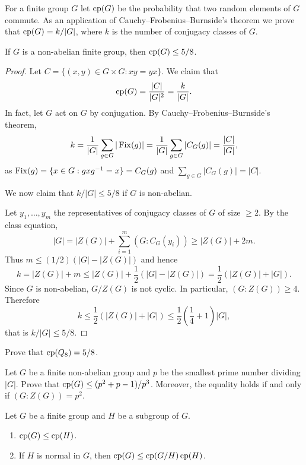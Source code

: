For a finite group $G$ let $\operatorname{cp}(G)$ be the probability 
that two random elements of $G$ commute. 
As an application of Cauchy--Frobenius--Burnside's theorem we
prove that 
$\operatorname{cp}(G)=k/|G|$, where $k$ is the number of conjugacy classes
of $G$.

\begin{theorem}
    If $G$ is a non-abelian finite group, then $\operatorname{cp}(G)\leq5/8$.
\end{theorem}

\begin{proof}
    Let $C=\{(x,y)\in G\times G:xy=yx\}$. We claim that  
    \[
    \operatorname{cp}(G)=\frac{|C|}{|G|^2}=\frac{k}{|G|}.
    \]
    In fact, let $G$ act on $G$ by conjugation. 
    By Cauchy--Frobenius--Burnside's theorem, 
    \[
    k=\frac{1}{|G|}\sum_{g\in G}|\operatorname{Fix}(g)|=\frac{1}{|G|}\sum_{g\in G}|C_G(g)|=\frac{|C|}{|G|},
    \]
    as $\operatorname{Fix}(g)=\{x\in G:gxg^{-1}=x\}=C_G(g)$ and $\sum_{g\in G}|C_G(g)|=|C|$. 

    We now claim that $k/|G|\leq 5/8$ if $G$ is non-abelian.
    
    Let $y_1,\dots,y_m$ the representatives of conjugacy classes of $G$ 
    of size $\geq2$. By the class equation, 
    \[
    |G|=|Z(G)|+\sum_{i=1}^m(G:C_G(y_i))\geq |Z(G)|+2m.
    \]
    Thus $m\leq(1/2)(|G|-|Z(G)|)$ and hence 
    \[
    k=|Z(G)|+m\leq |Z(G)|+\frac12(|G|-|Z(G)|)=\frac12(|Z(G)|+|G|).
    \]
    Since $G$ is non-abelian, $G/Z(G)$ is not cyclic. In particular, 
    $(G:Z(G))\geq4$. Therefore
    \[
    k\leq\frac12(|Z(G)|+|G|)\leq\frac12\left(\frac14+1\right)|G|,
    \]
    that is $k/|G|\leq 5/8$. 
\end{proof}

\begin{exercise}
    Prove that $\operatorname{cp}(Q_8)=5/8$. 
\end{exercise}

\begin{exercise}
    Let $G$ be a finite non-abelian group and $p$ be the smallest prime number
    dividing $|G|$. Prove that $\operatorname{cp}(G)\leq (p^2+p-1)/p^3$. Moreover, 
    the equality holds if and only if $(G:Z(G))=p^2$. 
\end{exercise}

\begin{exercise}
    Let $G$ be a finite group and $H$ be a subgroup of $G$.
    \begin{enumerate}
        \item $\operatorname{cp}(G)\leq\operatorname{cp}(H)$.
        \item If $H$ is normal in $G$, then $\operatorname{cp}(G)\leq\operatorname{cp}(G/H)\operatorname{cp}(H)$.
    \end{enumerate}
\end{exercise}

